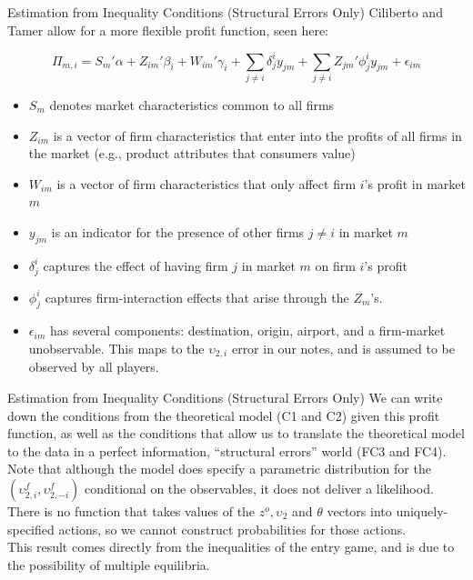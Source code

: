 \documentclass[aspectratio=169,11pt]{beamer}
\begin{document}
\begin{frame}{\normalsize Estimation from Inequality Conditions (Structural Errors Only)}
Ciliberto and Tamer allow for a more flexible profit function, seen here:

\begin{equation*}
\Pi_{m,i} =S_m'\alpha + Z_{im}' \beta_i + W_{im}'\gamma_i + \sum_{j \neq i} \delta_{j}^{i}y_{jm} + \sum_{j \neq i} Z_{jm}'\phi_j^i y_{jm} + \epsilon_{im}
\end{equation*}

\noindent
\footnotesize
\begin{itemize}
\item $S_m$ denotes market characteristics common to all firms
\item $Z_{im}$ is a vector of firm characteristics that enter into the profits of all firms in the market (e.g., product attributes that consumers value)
\item $W_{im}$ is a vector of firm characteristics that only affect firm $i$'s profit in market $m$
\item $y_{jm}$ is an indicator for the presence of other firms $j\neq i$ in market $m$
\item $\delta_{j}^{i}$ captures the effect of having firm $j$ in market $m$ on firm $i$'s profit
\item $\phi_j^i$ captures firm-interaction effects that arise through the $Z_m$'s.
\item $\epsilon_{im}$ has several components: destination, origin, airport, and a firm-market unobservable.  This maps to the $\upsilon_{2,i}$ error in our notes, and is assumed to be observed by all players.
\end{itemize}
\end{frame}

\begin{frame}{\normalsize Estimation from Inequality Conditions (Structural Errors Only)}
We can write down the conditions from the theoretical model (C1 and C2) given this profit function, as well as the conditions that allow us to translate the theoretical model to the data in a perfect information, ``structural errors'' world (FC3 and FC4).  \\
\vspace{0.2in} 
Note that although the model
does specify a parametric distribution for the $(\upsilon
_{2,i}^{f},\upsilon _{2,-i}^{f})$ conditional on the observables, it does
not deliver a likelihood.  \\
\vspace{0.2in} There is no function that takes values of the $%
z^{o},\upsilon _{2}$ and $\theta $ vectors into uniquely-specified actions,
so we cannot construct probabilities for those actions.  \\
\vspace{0.2in} 
This result comes directly from the inequalities of the entry game, and is due to the possibility of multiple equilibria.  
\end{frame}
\end{document}
